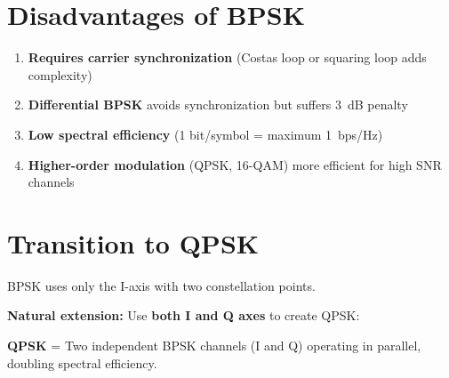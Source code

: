 \section{Disadvantages of BPSK}

\begin{enumerate}
\item \textbf{Requires carrier synchronization} (Costas loop or squaring loop adds complexity)
\item \textbf{Differential BPSK} avoids synchronization but suffers 3~dB penalty
\item \textbf{Low spectral efficiency} (1 bit/symbol = maximum 1~bps/Hz)
\item \textbf{Higher-order modulation} (QPSK, 16-QAM) more efficient for high SNR channels
\end{enumerate}

\section{Transition to QPSK}

BPSK uses only the I-axis with two constellation points.

\textbf{Natural extension:} Use \textbf{both I and Q axes} to create QPSK:

\begin{center}
\end{center}

\textbf{QPSK} = Two independent BPSK channels (I and Q) operating in parallel, doubling spectral efficiency.

